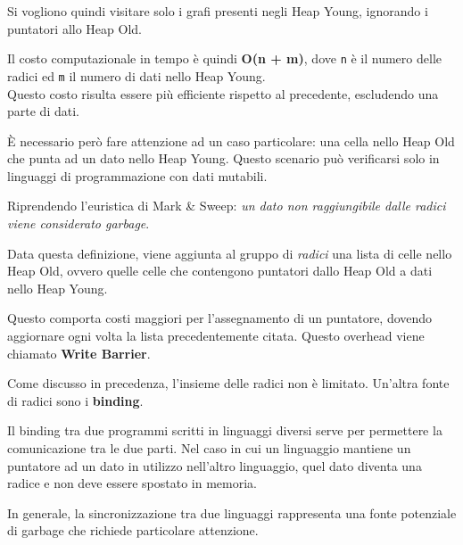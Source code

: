 \documentclass{article}
\begin{document}
Si vogliono quindi visitare solo i grafi presenti negli Heap Young, ignorando i puntatori allo Heap Old.

Il costo computazionale in tempo è quindi \textbf{O(n + m)}, dove \texttt{n} è il numero delle radici ed \texttt{m} il numero di dati nello Heap Young.\\
Questo costo risulta essere più efficiente rispetto al precedente, escludendo una parte di dati.

\vspace{8pt}
È necessario però fare attenzione ad un caso particolare: una cella nello Heap Old che punta ad un dato nello Heap Young. Questo scenario può verificarsi solo in linguaggi di programmazione con dati mutabili.

Riprendendo l'euristica di Mark \& Sweep: \textit{un dato non raggiungibile dalle radici viene considerato garbage}.

Data questa definizione, viene aggiunta al gruppo di \textit{radici} una lista di celle nello Heap Old, ovvero quelle celle che contengono puntatori dallo Heap Old a dati nello Heap Young.

Questo comporta costi maggiori per l'assegnamento di un puntatore, dovendo aggiornare ogni volta la lista precedentemente citata. Questo overhead viene chiamato \textbf{Write Barrier}.

\vspace{14pt}
Come discusso in precedenza, l'insieme delle radici non è limitato. Un'altra fonte di radici sono i \textbf{binding}.

Il binding tra due programmi scritti in linguaggi diversi serve per permettere la comunicazione tra le due parti. Nel caso in cui un linguaggio mantiene un puntatore ad un dato in utilizzo nell'altro linguaggio, quel dato diventa una radice e non deve essere spostato in memoria.

In generale, la sincronizzazione tra due linguaggi rappresenta una fonte potenziale di garbage che richiede particolare attenzione.
\end{document}

